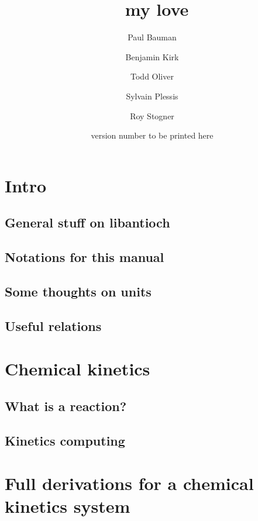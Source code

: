 \documentclass{article}
\begin{document}
\title{\antioch\ my love}
\date{version number to be printed here}
\author{Paul Bauman \and Benjamin Kirk \and Todd Oliver \and Sylvain Plessis \and Roy Stogner}

\maketitle
\tableofcontents

\section{Intro}

\subsection{General stuff on libantioch}


\subsection{Notations for this manual}


\subsection{Some thoughts on units}
\label{units_in_Antioch}


\subsection{Useful relations}
\label{relations}


\section{Chemical kinetics}
\subsection{What is a reaction?}
\label{kinetics_gen}

\subsection{Kinetics computing}
\label{kinetics_comput}


\section{Full derivations for a chemical kinetics system}
\label{derivations}

\end{document}

